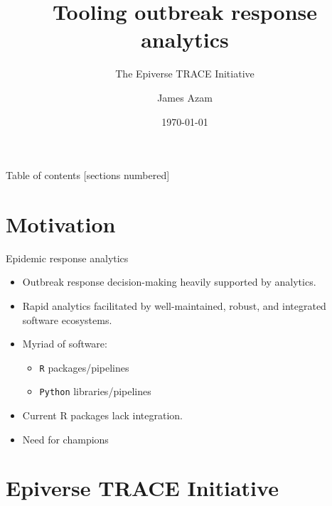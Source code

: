 \documentclass[10pt]{beamer}
\title{Tooling outbreak response analytics}
\subtitle{The Epiverse TRACE Initiative}
\date{\today}
\author{James Azam}
\institute{Epiverse Initiative, London School of Hygiene and Tropical Medicine}
\begin{document}
\begin{frame}
	\titlepage
\end{frame}


\begin{frame}{Table of contents}
  [sections numbered]
  \tableofcontents[hideallsubsections]
\end{frame}

\section{Motivation}

\begin{frame}[fragile]{Epidemic response analytics}
\begin{itemize}
\item Outbreak response decision-making heavily supported by analytics. 
\item Rapid analytics facilitated by well-maintained, robust, and integrated software ecosystems. 
\item Myriad of software:
\begin{itemize}
	\item \texttt{R} packages/pipelines
	\item \texttt{Python} libraries/pipelines
\end{itemize}
\item Current R packages lack integration.
\item Need for champions 
\end{itemize}
\end{frame}

\section{Epiverse TRACE Initiative}
\end{document}
